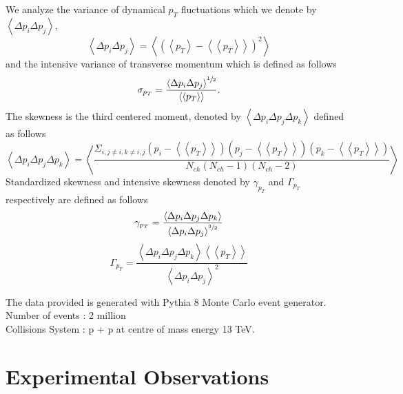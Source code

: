 \documentclass[letterpaper,aps,prc,superscriptaddress,nofootinbib,10pt,showpacs,floatfix]{revtex4-2}%
\newcommand{\bfrac}[2]{\frac{\displaystyle #1}{\displaystyle #2}}
\begin{document}
We analyze the variance of dynamical $p_T$ fluctuations which we denote by $\left<\Delta p_i \Delta p_j\right>$,
\begin{equation}
\label{eq:2}
\left<\Delta p_i \Delta p_j\right>=\left<\left(\left<p_T\right>-\left<\left<p_T\right>\right>\right)^2\right>
\end{equation}
and the intensive variance of transverse momentum which is defined as follows
\begin{equation}
\label{eq:3}
\sigma_{p_T}=\bfrac{\left<\Delta p_i \Delta p_j\right>^{\sfrac{1}{2}}}{\left<\left<p_T\right>\right>}.
\end{equation}
The skewness is the third centered moment, denoted by $\left<\Delta p_i \Delta p_j \Delta p_k\right>$ defined as follows
\begin{equation}
\label{eq:4}
\left<\Delta p_i \Delta p_j \Delta p_k\right>=\left<\bfrac{\Sigma_{i,j\neq i, k\neq i,j} {(p_i-\left<\left<p_T\right>\right>)(p_j-\left<\left<p_T\right>\right>)(p_k-\left<\left<p_T\right>\right>)}}{N_{ch}(N_{ch}-1)(N_{ch}-2)}\right>
\end{equation}
Standardized skewness and intensive skewness denoted by $\gamma_{p_T}$ and $\Gamma_{p_T}$ respectively are defined as follows
\begin{equation}
\label{eq:5}
\gamma_{p_T}=\bfrac{\left<\Delta p_i \Delta p_j \Delta p_k\right>}{\left<\Delta p_i \Delta p_j\right>^{\sfrac{3}{2}}}
\end{equation}
\begin{equation}
\label{eq:6}
\Gamma_{p_T}= \bfrac{\left<\Delta p_i \Delta p_j \Delta p_k\right>\left<\left<p_T\right>\right>}{\left<\Delta p_i \Delta p_j\right>^2}
\end{equation}


The data provided is generated with Pythia 8  Monte Carlo event generator. \\
Number of events :  2 million \\
Collisions System :  p + p at centre of mass energy 13 TeV.\\



\section{Experimental Observations }


\end{document}
